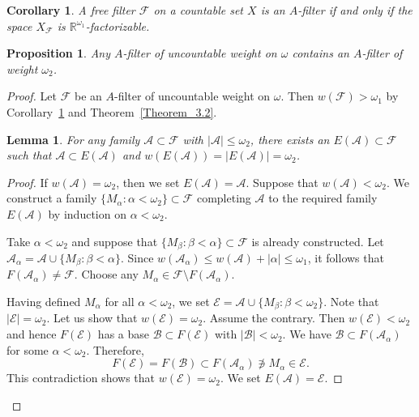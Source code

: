 \documentclass[10pt,a4paper]{amsart}
\newtheorem{corollary}{Corollary}
\newtheorem{proposition}{Proposition}
\newtheorem{lemma}{Lemma}
\begin{document}
\begin{corollary}
\label{Corollary_4.1}
 A free filter $\mathscr F$  on a countable set $X$ is an $A$-filter if and only if 
the space $X_{\mathscr F}$ is $\mathbb 
R^{\omega_1}$-factorizable.
\end{corollary}

\begin{proposition}
\label{Proposition_4.5}
Any  $A$-filter of uncountable weight on $\omega$ contains an $A$-filter 
of weight $\omega_2$. 
\end{proposition}

\begin{proof}
Let $\mathscr F$ be an $A$-filter of uncountable weight on $\omega$. 
Then $w(\mathscr F)>\omega_1$ by Corollary~\ref{Corollary_4.1} and 
Theorem~\ref{Theorem_3.2}. 

\begin{lemma}
For any family $\mathscr A\subset \mathscr F$ with $|\mathscr A|\leq\omega_2$, there exists an 
$E(\mathscr A)\subset \mathscr F$ such that $\mathscr A\subset E(\mathscr A)$ and 
$w(E(\mathscr A))=| E(\mathscr A)|=\omega_2$. 
\end{lemma}
 
\begin{proof} 
If $w(\mathscr A)=\omega_2$, then we set $E(\mathscr A)=\mathscr A$. Suppose that $w(\mathscr 
A)<\omega_2$. We construct a family $\{M_\alpha:\alpha<\omega_2\}\subset \mathscr F$ completing $\mathscr A$ 
to the required family $E(\mathscr A)$ by induction on $\alpha<\omega_2$.

Take $\alpha<\omega_2$ and suppose that $\{M_\beta:\beta<\alpha\}\subset \mathscr F$ is already constructed. 
Let $\mathscr A_\alpha=\mathscr A\cup\{M_\beta:\beta<\alpha\}$. Since 
$w(\mathscr A_\alpha)\leq w(\mathscr A)+|\alpha|\le\omega_1$, it follows 
that $F(\mathscr A_\alpha)\neq \mathscr 
F$. Choose any $M_\alpha\in \mathscr F\setminus F(\mathscr A_\alpha)$. 

Having defined $M_\alpha$ for all $\alpha<\omega_2$, we set $\mathscr E=\mathscr 
A\cup\{M_\beta:\beta<\omega_2\}$. Note that $|\mathscr E|=\omega_2$. Let us show that $w(\mathscr 
E)=\omega_2$. Assume the contrary. Then $w(\mathscr E)<\omega_2$ and hence $F(\mathscr E)$ has a base $\mathscr 
B\subset F(\mathscr E)$ with $|\mathscr B|<\omega_2$. We have $\mathscr B\subset F(\mathscr A_\alpha)$ for 
some $\alpha<\omega_2$. Therefore, 
$$
F(\mathscr E)=F(\mathscr B)\subset F(\mathscr A_\alpha) \not\ni M_\alpha 
\in \mathscr E.
$$ 
This contradiction shows that $w(\mathscr E)=\omega_2$. We set $E(\mathscr A)=\mathscr E$. 
\end{proof}


\end{proof}
\end{document}
